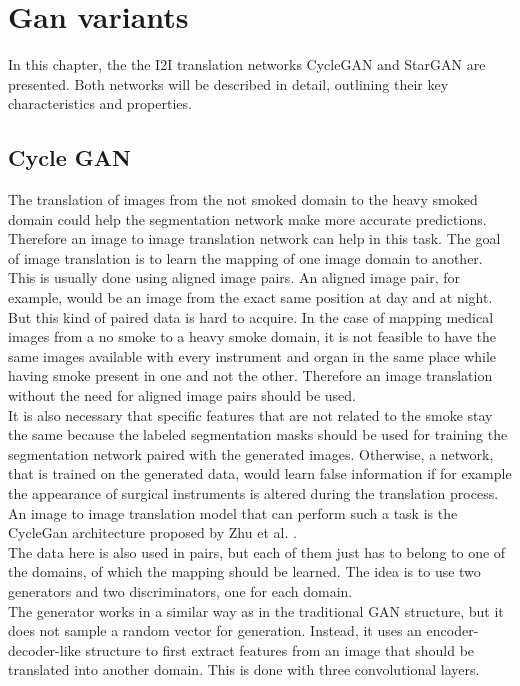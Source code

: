 \section{Gan variants}\label{gan_var_l}
In this chapter, the the I2I translation networks CycleGAN and StarGAN are presented. 
Both networks will be described in detail, outlining their key characteristics and properties.
\subsection{Cycle GAN}\label{cyclegan}
The translation of images from the not smoked domain to the heavy smoked domain could help the segmentation network make more accurate predictions.
Therefore an image to image translation network can help in this task.
The goal of image translation is to learn the mapping of one image domain to another.
This is usually done using aligned image pairs.
An aligned image pair, for example, would be an image from the exact same position at day and at night.
But this kind of paired data is hard to acquire.
In the case of mapping medical images from a no smoke to a heavy smoke domain, it is not feasible to have the same images available with every instrument and organ in the same place while having smoke present in one and not the other.
Therefore an image translation without the need for aligned image pairs should be used.\\
It is also necessary that specific features that are not related to the smoke stay the same because the labeled segmentation masks should be used for training the segmentation network paired with the generated images.
Otherwise, a network, that is trained on the generated data, would learn false information if for example the appearance of surgical instruments is altered during the translation process.
An image to image translation model that can perform such a task is the CycleGan architecture proposed by Zhu et al. \cite{Zhu2017}.\\
The data here is also used in pairs, but each of them just has to belong to one of the domains, of which the mapping should be learned.
The idea is to use two generators and two discriminators, one for each domain.\\
The generator works in a similar way as in the traditional GAN structure, but it does not sample a random vector for generation.
Instead, it uses an encoder-decoder-like structure to first extract features from an image that should be translated into another domain.
This is done with three convolutional layers.
